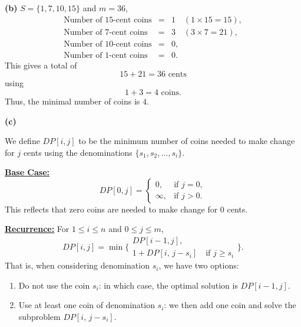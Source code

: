 \documentclass[11pt]{article}
\begin{document}
    \medskip
    
    \textbf{(b)} \(S=\{1, 7, 10, 15\}\) and \(m=36\),
    \[
    \begin{array}{rcl}
    \text{Number of 15-cent coins} &=& 1 \quad (1\times15=15),\\[1mm]
    \text{Number of 7-cent coins}  &=& 3 \quad (3\times7=21),\\[1mm]
    \text{Number of 10-cent coins} &=& 0,\\[1mm]
    \text{Number of 1-cent coins}  &=& 0.
    \end{array}
    \]
    This gives a total of 
    \[
    15+21=36 \text{ cents}
    \]
    using 
    \[
    1+3=4 \text{ coins}.
    \]
    Thus, the minimal number of coins is \(\boxed{4}\).
    
    \medskip
    
    \textbf{(c)}
    
    We define \(DP[i,j]\) to be the minimum number of coins needed to make change for \(j\) cents using the denominations \(\{s_1, s_2, \dots, s_i\}\).
    
    \medskip
    
    \underline{\textbf{Base Case:}}
    \[
    DP[0,j]=
    \begin{cases}
    0, & \text{if } j=0,\\[1mm]
    \infty, & \text{if } j>0.
    \end{cases}
    \]
    This reflects that zero coins are needed to make change for 0 cents.
    
    \medskip
    
    \underline{\textbf{Recurrence:}}
    For \(1\le i\le n\) and \(0\le j\le m\),
    \[
    DP[i,j] = \min \Biggl\{
    \begin{array}{l}
    DP[i-1,j],\\[1mm]
    1 + DP[i,\, j-s_i] \quad \text{if } j\ge s_i
    \end{array}
    \Biggr\}.
    \]
    That is, when considering denomination \(s_i\), we have two options:
    \begin{enumerate}
        \item Do not use the coin \(s_i\): in which case, the optimal solution is \(DP[i-1,j]\).
        \item Use at least one coin of denomination \(s_i\): we then add one coin and solve the subproblem \(DP[i,\, j-s_i]\).
    \end{enumerate}
    
    \medskip
    
\end{document}
